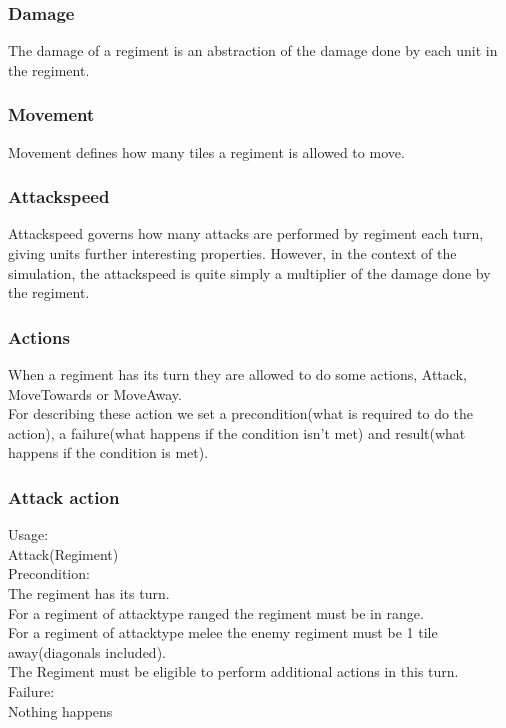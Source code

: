 		\subsubsection{Damage}
		The damage of a regiment is an abstraction of the damage done by each unit in the regiment. 
		
		\subsubsection{Movement}
		Movement defines how many tiles a regiment is allowed to move.
		
		\subsubsection{Attackspeed}
		Attackspeed governs how many attacks are performed by regiment each turn, giving units further interesting properties. 
		However, in the context of the simulation, the attackspeed is quite simply a multiplier of the damage done by the regiment.
		
		\subsubsection{Actions}
		When a regiment has its turn they are allowed to do some actions, Attack, MoveTowards or MoveAway. \\
		For describing these action we set a precondition(what is required to do the action), a failure(what happens if the condition isn't met)
		and result(what happens if the condition is met).
		
		\subsubsection{Attack action}
		Usage: \\
		Attack(Regiment) \\
		
		Precondition: \\
		The regiment has its turn. \\
		For a regiment of attacktype ranged the regiment must be in range. \\
		For a regiment of attacktype melee the enemy regiment must be 1 tile away(diagonals included). \\
		The Regiment must be eligible to perform additional actions in this turn.\\
		
		Failure: \\
		Nothing happens \\
		
